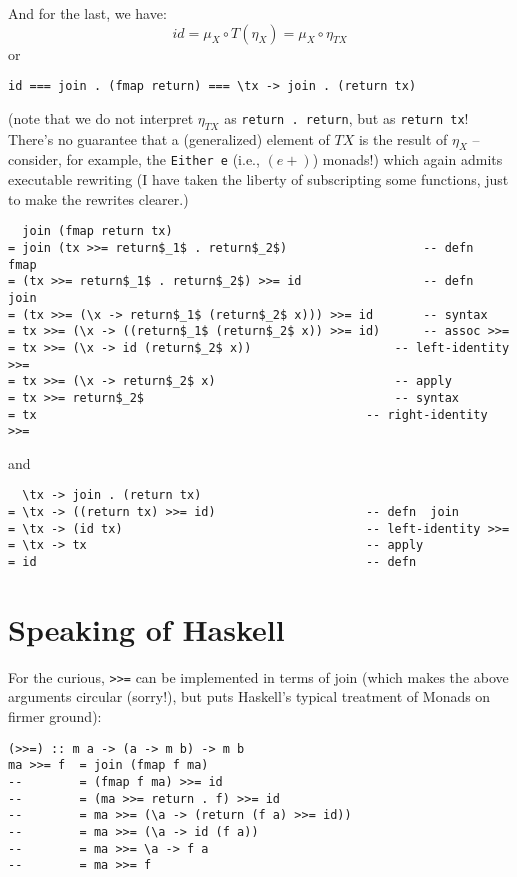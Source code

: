 \documentclass[10pt,letterpaper]{article}
\begin{document}
And for the last, we have:
\[ id = \mu_X \circ T(\eta_X) = \mu_X \circ \eta_{TX} \]
or
\begin{lstlisting}
id === join . (fmap return) === \tx -> join . (return tx)
\end{lstlisting}
(note that we do not interpret $\eta_{TX}$ as \texttt{return . return}, but
as \texttt{return tx}!  There's no guarantee that a (generalized) element of
$TX$ is the result of $\eta_X$ -- consider, for example, the \texttt{Either
e} (i.e., $(e+)$) monads!)
which again admits executable rewriting (I have taken the liberty of
subscripting some functions, just to make the rewrites clearer.)
\begin{lstlisting}
  join (fmap return tx)
= join (tx >>= return$_1$ . return$_2$)                   -- defn  fmap
= (tx >>= return$_1$ . return$_2$) >>= id                 -- defn  join
= (tx >>= (\x -> return$_1$ (return$_2$ x))) >>= id       -- syntax
= tx >>= (\x -> ((return$_1$ (return$_2$ x)) >>= id)      -- assoc >>=
= tx >>= (\x -> id (return$_2$ x))                    -- left-identity >>=
= tx >>= (\x -> return$_2$ x)                         -- apply
= tx >>= return$_2$                                   -- syntax
= tx                                              -- right-identity >>=
\end{lstlisting}
and
\begin{lstlisting}
  \tx -> join . (return tx)
= \tx -> ((return tx) >>= id)                     -- defn  join
= \tx -> (id tx)                                  -- left-identity >>=
= \tx -> tx                                       -- apply
= id                                              -- defn
\end{lstlisting}

\section{Speaking of Haskell}

For the curious, \verb|>>=| can be implemented in terms of join (which makes
the above arguments circular (sorry!), but puts Haskell's typical treatment
of Monads on firmer ground):
\begin{lstlisting}
(>>=) :: m a -> (a -> m b) -> m b
ma >>= f  = join (fmap f ma)
--        = (fmap f ma) >>= id
--        = (ma >>= return . f) >>= id
--        = ma >>= (\a -> (return (f a) >>= id))
--        = ma >>= (\a -> id (f a))
--        = ma >>= \a -> f a
--        = ma >>= f
\end{lstlisting}
\end{document}
